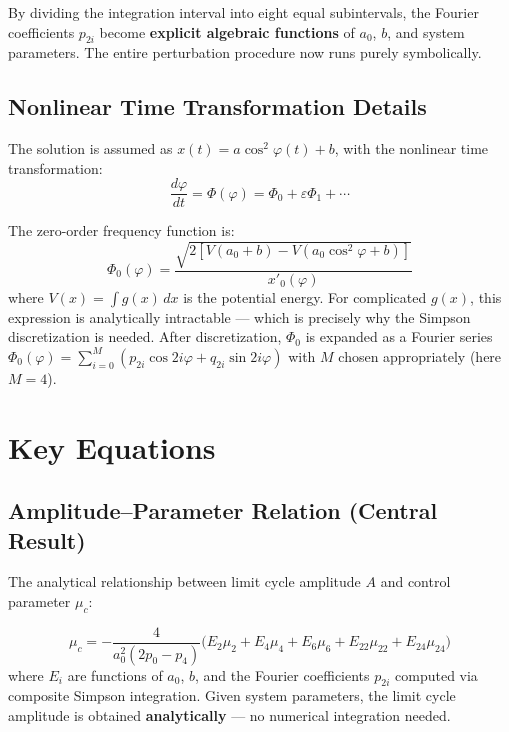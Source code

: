 \documentclass[11pt,a4paper]{article}
\begin{document}
By dividing the integration interval into eight equal subintervals, the Fourier coefficients $p_{2i}$ become \textbf{explicit algebraic functions} of $a_0$, $b$, and system parameters. The entire perturbation procedure now runs purely symbolically.

\subsection{Nonlinear Time Transformation Details}

The solution is assumed as $x(t) = a\cos^2\varphi(t) + b$, with the nonlinear time transformation:
\begin{equation}
\frac{d\varphi}{dt} = \Phi(\varphi) = \Phi_0 + \varepsilon\Phi_1 + \cdots
\end{equation}

The zero-order frequency function is:
\begin{equation}
\Phi_0(\varphi) = \frac{\sqrt{2[V(a_0+b) - V(a_0\cos^2\varphi + b)]}}{x'_0(\varphi)}
\end{equation}
where $V(x) = \int g(x)\,dx$ is the potential energy. For complicated $g(x)$, this expression is analytically intractable --- which is precisely why the Simpson discretization is needed. After discretization, $\Phi_0$ is expanded as a Fourier series $\Phi_0(\varphi) = \sum_{i=0}^{M} (p_{2i}\cos 2i\varphi + q_{2i}\sin 2i\varphi)$ with $M$ chosen appropriately (here $M=4$).

\section{Key Equations}

\subsection{Amplitude--Parameter Relation (Central Result)}

The analytical relationship between limit cycle amplitude $A$ and control parameter $\mu_c$:

\begin{equation}
\boxed{\mu_c = -\frac{4}{a_0^2(2p_0 - p_4)}\Big(E_2\mu_2 + E_4\mu_4 + E_6\mu_6 + E_{22}\mu_{22} + E_{24}\mu_{24}\Big)}
\label{eq:amplitude}
\end{equation}
where $E_i$ are functions of $a_0$, $b$, and the Fourier coefficients $p_{2i}$ computed via composite Simpson integration. Given system parameters, the limit cycle amplitude is obtained \textbf{analytically} --- no numerical integration needed.
\end{document}

